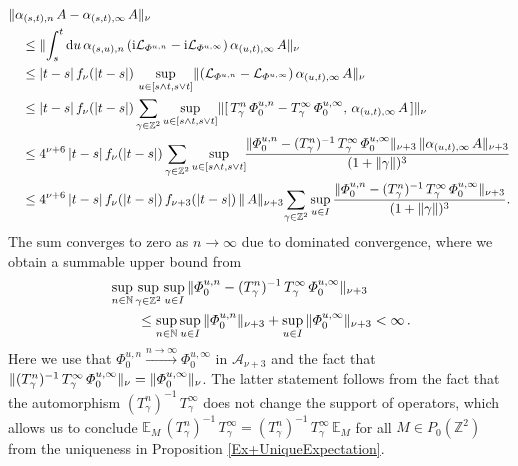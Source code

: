 \documentclass[a4paper]{article}
\newcommand{\E}{\mathbb{E}}
\renewcommand{\i}{\mathrm{i}}
\renewcommand{\Phi}{\varPhi}
\newcommand{\g}{\gamma}
\newcommand{\N}{\mathbb{N}}
\newcommand{\Z}{\mathbb{Z}}
\newcommand{\mA}{\mathcal{A}}
\newcommand{\mL}{\mathcal{L}}
\newcommand{\dd}{\mathrm{d}}
\DeclarePairedDelimiter\norm{\lVert}{\rVert}
\DeclarePairedDelimiter\abs{\lvert}{\rvert}
\theoremstyle{plain}
\theoremstyle{definition}
\theoremstyle{remark}
\renewcommand{\(}{\left(}
\renewcommand{\)}{\right)}
\begin{document}
    \begin{align*}
        \hspace{1em}&\hspace{-1em}
        \lVert \alpha_{(s,t),n} \, A - \alpha_{(s,t),\infty} \, A \rVert_\nu 
        \\
        &\leq 
        \lVert \int_{s }^{t} \dd u \,  \alpha_{(s,u),n} \, (\i\mL_{\Phi^{u,n}} - \i\mL_{\Phi^{u,\infty}}) \, \alpha_{(u,t),\infty} \, A \rVert_\nu 
        \\
        &\leq
        \lvert t- s \rvert \, f_\nu(\abs{t-s}) \, \sup_{u\in [s \land t, s\lor t]} \lVert (\mL_{\Phi^{u,n}} - \mL_{\Phi^{u,\infty}}) \, \alpha_{(u,t),\infty} \, A \rVert_\nu
        \\
        &\leq
        \abs{t- s} \, f_\nu(\abs{t-s})   \sum_{\g \in \Z^2} \sup_{u\in [s \land t, s\lor t]} \lVert[\, T^n_\gamma \, \Phi^{u,n}_0 - T_\g^\infty \,  \Phi^{u,\infty}_0 , \, \alpha_{(u,t),\infty} \, A\, ] \rVert_\nu
        \\
        &\leq
        4^{\nu+6}\, \abs{t- s} \, f_\nu(\abs{t-s}) \sum_{\g \in \Z^2} \sup_{u\in [s \land t, s\lor t]}\!\! \frac{\lVert \Phi^{u,n}_0 - (T_\g^n)^{-1}\,T_\g^\infty \,  \Phi^{u,\infty}_0 \rVert_{\nu+3} \, \lVert \alpha_{(u,t),\infty} \, A \rVert_{\nu+3}}{(1+\lVert \g \rVert)^3}
        \\
        &\leq
        4^{\nu+6}\, \abs{t- s} \, f_\nu(\abs{t-s}) \, f_{\nu+3}(\abs{t-s}) \,  \lVert  \, A \rVert_{\nu+3} \!\sum_{\g \in \Z^2}  \sup_{u\in I}\frac{ \lVert \Phi^{u,n}_0 - (T_\g^n)^{-1}\,T_\g^\infty \,  \Phi^{u,\infty}_0 \rVert_{\nu+3} }{(1+\lVert \g \rVert)^3}
        .
    \end{align*}
    The sum converges to zero as $n\to \infty$ due to dominated convergence, where we obtain a summable upper bound from 
    \begin{align*}
        \hspace{2em}&\hspace{-2em}
       \sup_{n\in\N}  \sup_{\gamma\in\Z^2}\sup_{u\in I}\,\norm{\Phi^{u,n}_0 -(T_\g^n)^{-1}\,T_\g^\infty\, \Phi^{u,\infty}_0}_{\nu+3}
       \\
       &\leq
       \sup_{n\in\N} \sup_{u\in I}\,\norm{\Phi^{u,n}_0}_{\nu+3} + \sup_{u\in I}\,\norm{\Phi^{u,\infty}_0}_{\nu+3} <\infty\,.
    \end{align*}
    Here we use that $\Phi_0^{u,n}\stackrel{n\to\infty}{\rightarrow}\Phi_0^{u,\infty}$ in $\mA_{\nu+3}$
     and the fact that $\norm{(T_\g^n)^{-1}\,T_\g^\infty \, \Phi^{u,\infty}_0}_\nu = \norm{\Phi^{u,\infty}_0}_\nu$. The latter statement follows from the fact that the automorphism $(T_\g^n)^{-1}\,T_\g^\infty$ does not change the support of operators, which allows us to conclude $ \E_M \, (T_\g^n)^{-1}\,T_\g^\infty = (T_\g^n)^{-1}\,T_\g^\infty \, \E_M$ for all $M\in P_0(\Z^2)\,$  from the uniqueness in Proposition \ref{Ex+UniqueExpectation}.
    
\end{document}
